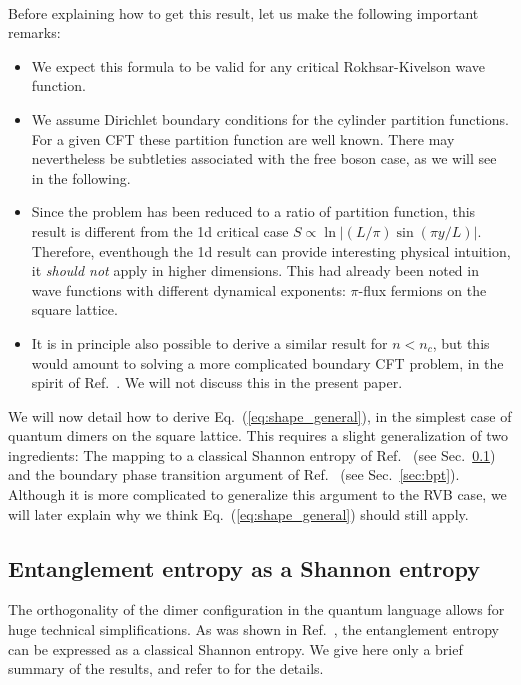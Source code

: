 \documentclass[11pt]{iopart}
\begin{document}
\paragraph{}Before explaining how to get this result, let us make the following important remarks:
\begin{itemize}
 \item We expect this formula to be valid for any critical Rokhsar-Kivelson wave function. 
 \item We assume Dirichlet boundary conditions for the cylinder partition functions. For a given CFT these partition function are well known\cite{BigYellowBook}. There may nevertheless be subtleties associated with the free boson case, as we will see in the following. 
 \item Since the problem has been reduced to a ratio of partition function, this result is different from the 1d critical case\cite{Cardy} $S\propto \ln \left|(L/\pi)\sin (\pi y/L)\right|$. Therefore, eventhough the 1d result can provide interesting physical intuition, it \emph{should not} apply in higher dimensions. This had already been noted in \cite{Ju2012} wave functions with different dynamical exponents: $\pi$-flux fermions on the square lattice.  
 \item It is in principle also possible to derive a similar result for $n<n_c$, but this would amount to solving a more complicated boundary CFT problem, in the spirit of Ref.~\cite{Oshikawa}. We will not discuss this in the present paper. 
\end{itemize}
We will now detail how to derive Eq.~(\ref{eq:shape_general}), in the simplest case of quantum dimers on the square lattice. This requires a slight generalization of two ingredients: The mapping to a classical Shannon entropy of Ref.~\cite{Shannonee} (see Sec.~\ref{sec:eeshannon}) and the boundary phase transition argument of Ref.~\cite{Stephan2011} (see Sec.~\ref{sec:bpt}). Although it is more complicated to generalize this argument to the RVB case, we will later explain why  we think Eq.~(\ref{eq:shape_general}) should still apply.
\subsection{Entanglement entropy as a Shannon entropy}
\label{sec:eeshannon}
The orthogonality of the dimer configuration in the quantum language allows for huge technical simplifications. As was shown in Ref.~\cite{Shannonee}, the entanglement entropy can be expressed as a classical Shannon entropy. We give here only a brief summary of the results, and refer to \cite{Shannonee} for the details.
\end{document}
